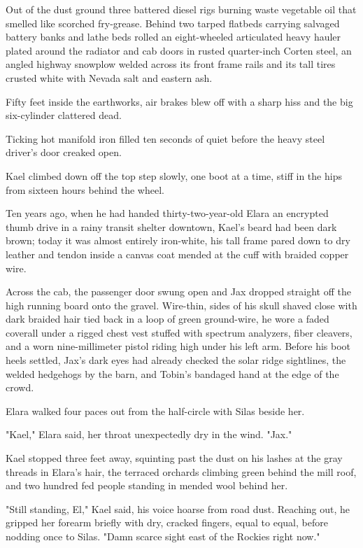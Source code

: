 Out of the dust ground three battered diesel rigs burning waste vegetable oil that smelled like scorched fry-grease. Behind two tarped flatbeds carrying salvaged battery banks and lathe beds rolled an eight-wheeled articulated heavy hauler plated around the radiator and cab doors in rusted quarter-inch Corten steel, an angled highway snowplow welded across its front frame rails and its tall tires crusted white with Nevada salt and eastern ash.

Fifty feet inside the earthworks, air brakes blew off with a sharp hiss and the big six-cylinder clattered dead.

Ticking hot manifold iron filled ten seconds of quiet before the heavy steel driver's door creaked open.

Kael climbed down off the top step slowly, one boot at a time, stiff in the hips from sixteen hours behind the wheel.

Ten years ago, when he had handed thirty-two-year-old Elara an encrypted thumb drive in a rainy transit shelter downtown, Kael's beard had been dark brown; today it was almost entirely iron-white, his tall frame pared down to dry leather and tendon inside a canvas coat mended at the cuff with braided copper wire.

Across the cab, the passenger door swung open and Jax dropped straight off the high running board onto the gravel. Wire-thin, sides of his skull shaved close with dark braided hair tied back in a loop of green ground-wire, he wore a faded coverall under a rigged chest vest stuffed with spectrum analyzers, fiber cleavers, and a worn nine-millimeter pistol riding high under his left arm. Before his boot heels settled, Jax's dark eyes had already checked the solar ridge sightlines, the welded hedgehogs by the barn, and Tobin's bandaged hand at the edge of the crowd.

Elara walked four paces out from the half-circle with Silas beside her.

"Kael," Elara said, her throat unexpectedly dry in the wind. "Jax."

Kael stopped three feet away, squinting past the dust on his lashes at the gray threads in Elara's hair, the terraced orchards climbing green behind the mill roof, and two hundred fed people standing in mended wool behind her.

"Still standing, El," Kael said, his voice hoarse from road dust. Reaching out, he gripped her forearm briefly with dry, cracked fingers, equal to equal, before nodding once to Silas. "Damn scarce sight east of the Rockies right now."


